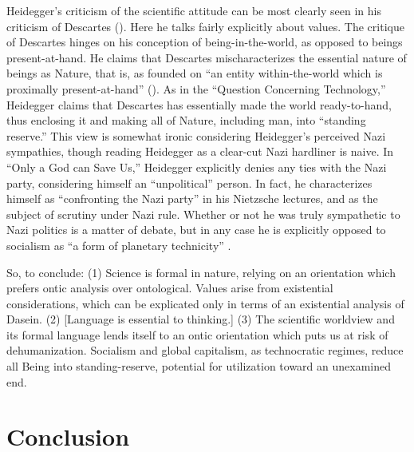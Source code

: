 \documentclass[leqno, 12pt]{turabian-researchpaper}
\begin{document}


	Heidegger's criticism of the scientific attitude can be most clearly seen in his
	criticism of Descartes (). Here
	he talks fairly explicitly about values. The critique of Descartes hinges on his
	conception of being-in-the-world, as opposed to beings present-at-hand. He claims
	that Descartes mischaracterizes the essential nature of beings as Nature, that
	is, as founded on \enquote{an entity within-the-world which is proximally present-at-hand}
	(). As in the \enquote{Question Concerning Technology,}
	\nocite{heidegger2008c} Heidegger claims that Descartes has essentially made the
	world ready-to-hand, thus enclosing it and making all of Nature, including man,
	into \enquote{standing reserve.} This view is somewhat ironic considering Heidegger's
	perceived Nazi sympathies, though reading Heidegger as a clear-cut Nazi
	hardliner is naive. In \enquote{Only a God can Save Us,} Heidegger explicitly
	denies any ties with the Nazi party, considering himself an \enquote{unpolitical}
	person. In fact, he characterizes himself as \enquote{confronting the Nazi party}
	in his Nietzsche lectures, and as the subject of scrutiny under Nazi rule. Whether
	or not he was truly sympathetic to Nazi politics is a matter of debate, but in
	any case he is explicitly opposed to socialism as \enquote{a form of planetary technicity}
	\autocite[206]{heidegger1981}.

	So, to conclude: (1) Science is formal in nature, relying on an orientation
	which prefers ontic analysis over ontological. Values arise from existential considerations,
	which can be explicated only in terms of an existential analysis of Dasein. (2)
	[Language is essential to thinking.] (3) The scientific worldview and its
	formal language lends itself to an ontic orientation which puts us at risk of
	dehumanization. Socialism and global capitalism, as technocratic regimes, reduce
	all Being into standing-reserve, potential for utilization toward an
	unexamined end.

	\section{Conclusion}
\end{document}
